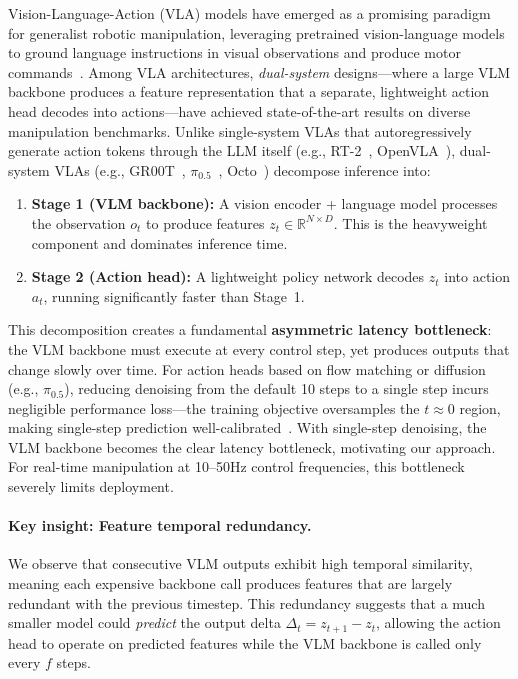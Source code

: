 \documentclass{article}
\begin{document}
Vision-Language-Action (VLA) models have emerged as a promising paradigm for generalist robotic manipulation, leveraging pretrained vision-language models to ground language instructions in visual observations and produce motor commands~\cite{brohan2023rt2, black2024pi0, bjorck2025groot}.
Among VLA architectures, \emph{dual-system} designs---where a large VLM backbone produces a feature representation that a separate, lightweight action head decodes into actions---have achieved state-of-the-art results on diverse manipulation benchmarks.
Unlike single-system VLAs that autoregressively generate action tokens through the LLM itself (e.g., RT-2~\cite{brohan2023rt2}, OpenVLA~\cite{kim2024openvla}), dual-system VLAs (e.g., GR00T~\cite{bjorck2025groot}, $\pi_{0.5}$~\cite{black2024pi0}, Octo~\cite{team2024octo}) decompose inference into:
\begin{enumerate}
    \item \textbf{Stage 1 (VLM backbone):} A vision encoder + language model processes the observation $o_t$ to produce features $z_t \in \mathbb{R}^{N \times D}$. This is the heavyweight component and dominates inference time.
    \item \textbf{Stage 2 (Action head):} A lightweight policy network decodes $z_t$ into action $a_t$, running significantly faster than Stage~1.
\end{enumerate}

This decomposition creates a fundamental \textbf{asymmetric latency bottleneck}: the VLM backbone must execute at every control step, yet produces outputs that change slowly over time.
For action heads based on flow matching or diffusion (e.g., $\pi_{0.5}$), reducing denoising from the default 10 steps to a single step incurs negligible performance loss---the training objective oversamples the $t \approx 0$ region, making single-step prediction well-calibrated~\cite{black2024pi0}.
With single-step denoising, the VLM backbone becomes the clear latency bottleneck, motivating our approach.
For real-time manipulation at 10--50Hz control frequencies, this bottleneck severely limits deployment.

\paragraph{Key insight: Feature temporal redundancy.}
We observe that consecutive VLM outputs exhibit high temporal similarity, meaning each expensive backbone call produces features that are largely redundant with the previous timestep.
This redundancy suggests that a much smaller model could \emph{predict} the output delta $\Delta_t = z_{t+1} - z_t$, allowing the action head to operate on predicted features while the VLM backbone is called only every $f$ steps.
\end{document}
